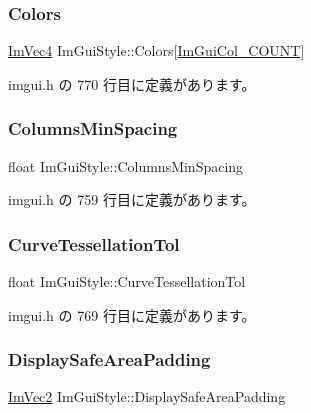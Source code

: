 \subsubsection{\texorpdfstring{Colors}{Colors}}
{\footnotesize\ttfamily \mbox{\hyperlink{struct_im_vec4}{Im\+Vec4}} Im\+Gui\+Style\+::\+Colors\mbox{[}\mbox{\hyperlink{imgui_8h_a8e46ef7d0c76fbb1916171edfa4ae9e7ac911e17bec14cc3339cf3901a197628b}{Im\+Gui\+Col\+\_\+\+C\+O\+U\+NT}}\mbox{]}}



 imgui.\+h の 770 行目に定義があります。

\mbox{\label{struct_im_gui_style_a8fed04481e1d75bb95c97819f545e2ba}} 
\subsubsection{\texorpdfstring{Columns\+Min\+Spacing}{ColumnsMinSpacing}}
{\footnotesize\ttfamily float Im\+Gui\+Style\+::\+Columns\+Min\+Spacing}



 imgui.\+h の 759 行目に定義があります。

\mbox{\label{struct_im_gui_style_a41eb9377b63b8b85ab807c28e00198e9}} 
\subsubsection{\texorpdfstring{Curve\+Tessellation\+Tol}{CurveTessellationTol}}
{\footnotesize\ttfamily float Im\+Gui\+Style\+::\+Curve\+Tessellation\+Tol}



 imgui.\+h の 769 行目に定義があります。

\mbox{\label{struct_im_gui_style_a8dd02a6a031ec8667e76aab1e28755bd}} 
\subsubsection{\texorpdfstring{Display\+Safe\+Area\+Padding}{DisplaySafeAreaPadding}}
{\footnotesize\ttfamily \mbox{\hyperlink{struct_im_vec2}{Im\+Vec2}} Im\+Gui\+Style\+::\+Display\+Safe\+Area\+Padding}



